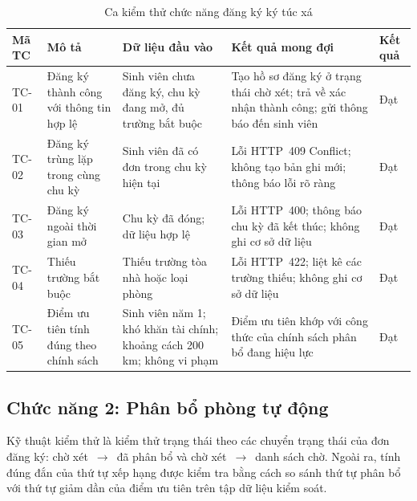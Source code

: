 \documentclass[../DoAn.tex]{subfiles}
\begin{document}
\vspace{-6pt}
\begin{table}[H]
\centering
\caption{Ca kiểm thử chức năng đăng ký ký túc xá}
\label{tab:tc_registration}
\footnotesize

\begin{tabular}{|p{1.1cm}|p{2.5cm}|p{3.2cm}|p{4.0cm}|p{1.2cm}|}
\hline
\textbf{Mã TC} &
\textbf{Mô tả} &
\textbf{Dữ liệu đầu vào} &
\textbf{Kết quả mong đợi} &
\textbf{Kết quả} \\
\hline

TC-01 &
Đăng ký thành công với thông tin hợp lệ &
Sinh viên chưa đăng ký, chu kỳ đang mở, đủ trường bắt buộc &
Tạo hồ sơ đăng ký ở trạng thái chờ xét; trả về xác nhận thành công; gửi thông báo đến sinh viên &
Đạt \\
\hline

TC-02 &
Đăng ký trùng lặp trong cùng chu kỳ &
Sinh viên đã có đơn trong chu kỳ hiện tại &
Lỗi HTTP~409 Conflict; không tạo bản ghi mới; thông báo lỗi rõ ràng &
Đạt \\
\hline

TC-03 &
Đăng ký ngoài thời gian mở &
Chu kỳ đã đóng; dữ liệu hợp lệ &
Lỗi HTTP~400; thông báo chu kỳ đã kết thúc; không ghi cơ sở dữ liệu &
Đạt \\
\hline

TC-04 &
Thiếu trường bắt buộc &
Thiếu trường tòa nhà hoặc loại phòng &
Lỗi HTTP~422; liệt kê các trường thiếu; không ghi cơ sở dữ liệu &
Đạt \\
\hline

TC-05 &
Điểm ưu tiên tính đúng theo chính sách &
Sinh viên năm 1; khó khăn tài chính; khoảng cách 200 km; không vi phạm &
Điểm ưu tiên khớp với công thức của chính sách phân bổ đang hiệu lực &
Đạt \\
\hline

\end{tabular}
\end{table}
\vspace{-4pt}

\subsection*{Chức năng 2: Phân bổ phòng tự động}

Kỹ thuật kiểm thử là kiểm thử trạng thái theo các chuyển
trạng thái của đơn đăng ký: chờ xét~$\to$~đã phân bổ và chờ xét~$\to$~danh
sách chờ. Ngoài ra, tính đúng đắn của thứ tự xếp hạng được kiểm tra bằng cách
so sánh thứ tự phân bổ với thứ tự giảm dần của điểm ưu tiên trên tập dữ liệu
kiểm soát.
\end{document}
